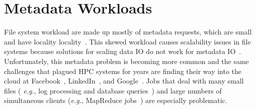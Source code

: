 
\section{Metadata Workloads}

File system workload are made up mostly of metadata requests, which are small
and have locality locality~\cite{roselli:atec2000-FS-workloads,
abad:ucc2012-mimesis, leung:atc08-cifs}.  This skewed workload causes
scalability issues in file systems because solutions for scaling data IO do not
work for metadata IO~\cite{roselli:atec2000-FS-workloads,
abad:techreport2012-fstrace, alam:pdsw2011-metadata-scaling,
weil:osdi2006-ceph}.  Unfortunately, this metadata problem is becoming more
common and the same challenges that plagued HPC systems for years are finding
their way into the cloud at Facebook~\cite{borthakur:website17},
LinkedIn~\cite{xiao:socc15-shardfs}, and Google~\cite{dean_evolution_2010,
mckusick:acm2010-gfs-evolution}.  Jobs that deal with many small files ({\it
e.g.}, log processing and database
queries~\cite{thusoo:sigmod2010-facebook-infrastructure}) and large numbers of
simultaneous clients ({\it e.g.}, MapReduce
jobs~\cite{mckusick:acm2010-gfs-evolution}) are especially problematic.

